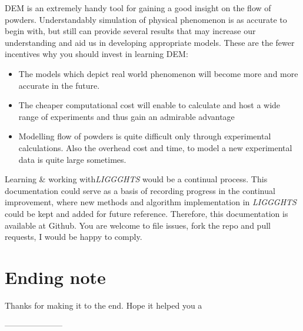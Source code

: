 \documentclass{tufte-book} %
\newcommand{\Li}{\textit{LIGGGHTS}\xspace}
\begin{document}
DEM is an extremely handy tool for gaining a good insight on the flow of powders. Understandably simulation of physical phenomenon is as accurate to begin with, but still can provide several results that may increase our understanding and aid us in developing appropriate models. These are the fewer incentives why you should invest in learning DEM:
\begin{itemize}
\item The models which depict real world phenomenon will become more and more accurate in the future. 
\item The cheaper computational cost will enable to calculate and host a wide range of experiments and thus gain an admirable advantage
\item Modelling flow of powders is quite difficult only through experimental calculations. Also the overhead cost and time, to model a new experimental data is quite large sometimes. 
\end{itemize}

Learning \& working with\Li would be a continual process. This documentation could serve as a basis of recording progress in the continual improvement, where new methods and algorithm implementation in \Li could be kept and added for future reference. Therefore, this documentation is available at Github. You are welcome to file issues, fork the repo and pull requests, I would be happy to comply. 

\section{Ending note}

Thanks for making it to the end. Hope it helped you a 

 ---------------------



\printindex %
\end{document}
